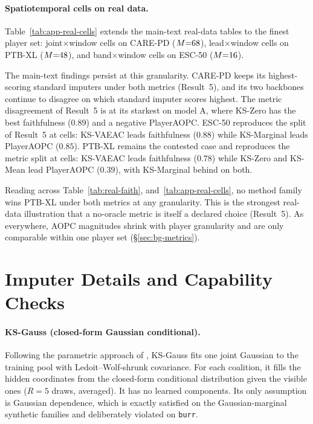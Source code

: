 \paragraph{Spatiotemporal cells on real data.}
Table~\ref{tab:app-real-cells} extends the main-text real-data tables to the
finest player set: joint$\times$window cells on CARE-PD ($M{=}68$),
lead$\times$window cells on PTB-XL ($M{=}48$), and band$\times$window
cells on ESC-50 ($M{=}16$).



The main-text findings persist at this granularity.  CARE-PD keeps its
highest-scoring standard imputers under both metrics (Result~5), and its two
backbones continue to disagree on which standard imputer scores highest.  The metric
disagreement of Result~5 is at its starkest on model A, where KS-Zero has
the best faithfulness ($0.89$) and a negative PlayerAOPC.  ESC-50
reproduces the split of Result~5 at cells: KS-VAEAC leads faithfulness
($0.88$) while KS-Marginal leads PlayerAOPC ($0.85$).  PTB-XL remains the
contested case and reproduces the metric split at cells: KS-VAEAC leads
faithfulness ($0.78$) while KS-Zero and KS-Mean lead PlayerAOPC ($0.39$),
with KS-Marginal behind on both.

Reading across Table~\ref{tab:real-faith},
and~\ref{tab:app-real-cells}, no method family wins PTB-XL under both
metrics at any granularity.  This is the strongest real-data illustration
that a no-oracle metric is itself a declared choice (Result~5).  As
everywhere, AOPC magnitudes shrink with player granularity and are only
comparable within one player set (\S\ref{sec:bg-metrics}).

\section{Imputer Details and Capability Checks}
\label{app:imputer_detail}

\paragraph{KS-Gauss (closed-form Gaussian conditional).}
Following the parametric approach of \citet{aas2021explaining}, KS-Gauss
fits one joint Gaussian to the training pool with Ledoit--Wolf-shrunk
covariance.  For each coalition, it fills the hidden coordinates from the
closed-form conditional distribution given the visible ones ($R{=}5$ draws,
averaged).  It has no learned components.  Its only assumption is Gaussian
dependence, which is exactly satisfied on the Gaussian-marginal synthetic
families and deliberately violated on \texttt{burr}.

